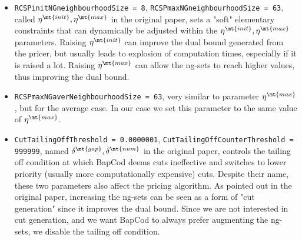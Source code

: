 \begin{itemize}
\begin{itemize}
		      \item \texttt{RCSPinitNGneighbourhoodSize = 8}, \texttt{RCSPmaxNGneighbourhoodSize = 63}, called $\eta^\mt{init}, \eta^\mt{max}$ in the original paper, sets a "soft" elementary constraints that can dynamically be adjusted within the $\eta^\mt{init}, \eta^\mt{max}$ parameters.
		            Raising $\eta^\mt{init}$ can improve the dual bound generated from the pricer, but usually leads to explosion of computation times, especially if it is raised a lot.
		            Raising $\eta^\mt{max}$ can allow the ng-sets to reach higher values, thus improving the dual bound.
		      \item \texttt{RCSPmaxNGaverNeighbourhoodSize = 63}, very similar to parameter $\eta^\mt{max}$, but for the average case.
		            In our case we set this parameter to the same value of $\eta^\mt{max}$.
		      \item \texttt{CutTailingOffThreshold = 0.0000001}, \texttt{CutTailingOffCounterThreshold = 999999}, named $\delta^\mt{gap}, \delta^\mt{num}$ in the original paper, controls the tailing off condition at which BapCod deems cuts ineffective and switches to lower priority (usually more computationally expensive) cuts.
		            Despite their name, these two parameters also affect the pricing algorithm.
		            As pointed out in the original paper, increasing the ng-sets can be seen as a form of "cut generation" since it improves the dual bound.
		            Since we are not interested in cut generation, and we want BapCod to always prefer augmenting the ng-sets, we disable the tailing off condition.
	      \end{itemize}
\end{itemize}

\begin{comment}
[Abount what is reduced cost fixing]
[ Bucket arc elimination procedure = Reduced cost fixing procedure]
\textcite{sadykov2021}
VRPSolver extension includes an implementation of the pricing functor which
allows the user to define the subproblems as resource constrained shortest path
problems in graphs. The functor implements the bucket-graph based labeling
algorithm from paper [16] for solving the pricing problem, as well as the corre-
sponding bucket arc elimination procedure (i.e. reduced cost fixing procedure),
and the elementary route enumeration procedure [1]. VRPSolver extension also
implements cut separation functors for rounded cap
\end{comment}
